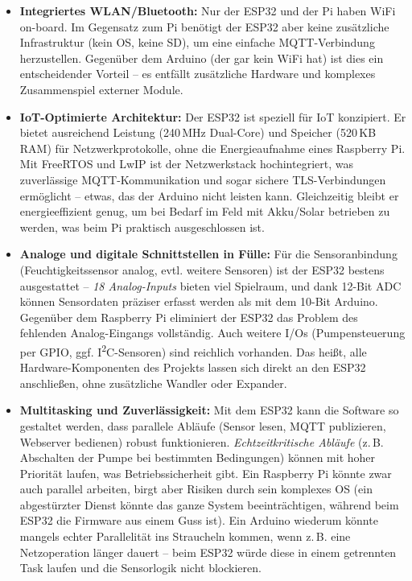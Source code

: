\begin{itemize}[leftmargin=*]
    \item \textbf{Integriertes WLAN/Bluetooth:} Nur der ESP32 und der Pi haben WiFi on-board. Im Gegensatz zum Pi benötigt der ESP32 aber keine zusätzliche Infrastruktur (kein OS, keine SD), um eine einfache MQTT-Verbindung herzustellen. Gegenüber dem Arduino (der gar kein WiFi hat) ist dies ein entscheidender Vorteil – es entfällt zusätzliche Hardware und komplexes Zusammenspiel externer Module.
    
    \item \textbf{IoT-Optimierte Architektur:} Der ESP32 ist speziell für IoT konzipiert. Er bietet ausreichend Leistung (240\,MHz Dual-Core) und Speicher (520\,KB RAM) für Netzwerkprotokolle, ohne die Energieaufnahme eines Raspberry Pi. Mit FreeRTOS und LwIP ist der Netzwerkstack hochintegriert, was zuverlässige MQTT-Kommunikation und sogar sichere TLS-Verbindungen ermöglicht – etwas, das der Arduino nicht leisten kann. Gleichzeitig bleibt er energieeffizient genug, um bei Bedarf im Feld mit Akku/Solar betrieben zu werden, was beim Pi praktisch ausgeschlossen ist.
    
    \item \textbf{Analoge und digitale Schnittstellen in Fülle:} Für die Sensoranbindung (Feuchtigkeitssensor analog, evtl. weitere Sensoren) ist der ESP32 bestens ausgestattet – \textit{18 Analog-Inputs} bieten viel Spielraum, und dank 12-Bit ADC können Sensordaten präziser erfasst werden als mit dem 10-Bit Arduino. Gegenüber dem Raspberry Pi eliminiert der ESP32 das Problem des fehlenden Analog-Eingangs vollständig. Auch weitere I/Os (Pumpensteuerung per GPIO, ggf. I\textsuperscript{2}C-Sensoren) sind reichlich vorhanden. Das heißt, alle Hardware-Komponenten des Projekts lassen sich direkt an den ESP32 anschließen, ohne zusätzliche Wandler oder Expander.
    
    \item \textbf{Multitasking und Zuverlässigkeit:} Mit dem ESP32 kann die Software so gestaltet werden, dass parallele Abläufe (Sensor lesen, MQTT publizieren, Webserver bedienen) robust funktionieren. \textit{Echtzeitkritische Abläufe} (z.\,B. Abschalten der Pumpe bei bestimmten Bedingungen) können mit hoher Priorität laufen, was Betriebssicherheit gibt. Ein Raspberry Pi könnte zwar auch parallel arbeiten, birgt aber Risiken durch sein komplexes OS (ein abgestürzter Dienst könnte das ganze System beeinträchtigen, während beim ESP32 die Firmware aus einem Guss ist). Ein Arduino wiederum könnte mangels echter Parallelität ins Straucheln kommen, wenn z.\,B. eine Netzoperation länger dauert – beim ESP32 würde diese in einem getrennten Task laufen und die Sensorlogik nicht blockieren.
    

\end{itemize}

